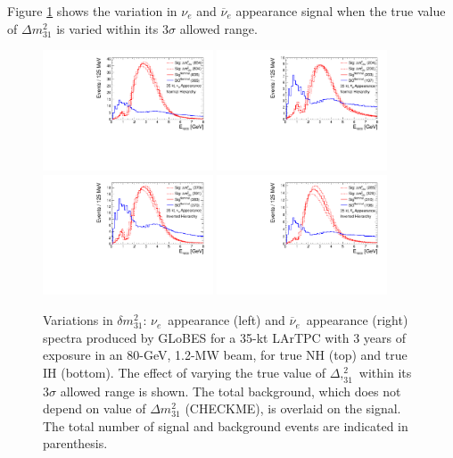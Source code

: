 \documentclass[letterpaper,11pt]{article}
\begin{document}
Figure \ref{fig:dmspec} shows the variation in $\nu_e$ and $\overline{\nu}_e$
appearance signal when the true value of $\Delta m^2_{31}$ is varied within its 3$\sigma$
allowed range. 
\begin{figure}[!htb]
  \centering
  \includegraphics[width=0.45\textwidth]{figs/spectra_35kt_nue_dmvar_nh.pdf}
  \includegraphics[width=0.45\textwidth]{figs/spectra_35kt_nuebar_dmvar_nh.pdf}
  \includegraphics[width=0.45\textwidth]{figs/spectra_35kt_nue_dmvar_ih.pdf}
  \includegraphics[width=0.45\textwidth]{figs/spectra_35kt_nuebar_dmvar_ih.pdf}
  \caption{
  Variations in $\delta m^2_{31}$:
  $\nu_e$~appearance (left) and $\overline{\nu}_e$~appearance (right) spectra 
  produced by GLoBES for a 35-kt LArTPC with 3 years of 
  exposure in an 80-GeV, 1.2-MW beam,  for true NH (top) and true IH (bottom). 
  The effect of varying the true
  value of $\Delta ,^2_{31}$ within its 3$\sigma$ allowed range is shown. 
  The total background, which does not depend on value of $\Delta m^2_{31}$ (CHECKME), 
  is overlaid on the signal. The total number
  of signal and background events are indicated in parenthesis.}
  \label{fig:dmspec}
\end{figure}
\end{document}
